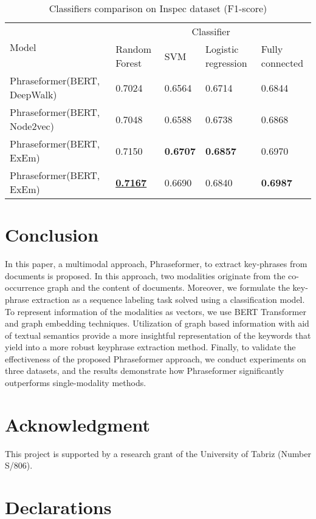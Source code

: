 \documentclass[review,3p]{elsarticle}
\begin{document}
\begin{table}[H]
\centering
	\caption{Classifiers comparison on Inspec dataset (F1-score)}
	\label{classifier_re_tb}
	\begin{tabular}{p{4.4cm}|p{3cm}|p{1.5cm}|p{3cm}|p{3cm}}
\hline
\multirow{2}{*}{Model} & \multicolumn{4}{c}{Classifier}\\
\cline{2-5}
&Random Forest  &  SVM   & Logistic regression & Fully connected \\
\hline
Phraseformer(BERT, DeepWalk)& 0.7024 & 0.6564& 0.6714& 0.6844\\ 
Phraseformer(BERT, Node2vec)& 0.7048& 0.6588 & 0.6738& 0.6868\\ 
Phraseformer(BERT, ExEm)&0.7150& \textbf{0.6707}& \textbf{0.6857}& 0.6970 \\ 
Phraseformer(BERT, ExEm)& \underline{\textbf{0.7167}}& 0.6690& 0.6840& \textbf{0.6987}\\ \hline

\end{tabular}
\end{table}

\section{Conclusion} \label{sec:conclusion}
In this paper, a multimodal approach, Phraseformer, to extract key-phrases from documents is proposed. In this approach, two modalities originate from the co-occurrence graph and the content of documents. Moreover, we formulate the key-phrase  extraction as a sequence  labeling task solved using a classification model. To represent information of the modalities as vectors, we use BERT Transformer and graph embedding techniques. Utilization of graph based information with aid of textual semantics provide a more insightful representation of the keywords that yield into a more robust keyphrase extraction method. Finally, to validate the effectiveness of the proposed Phraseformer approach, we conduct experiments  on  three  datasets,  and  the results demonstrate how Phraseformer significantly outperforms single-modality methods.

\section*{Acknowledgment}
This project is supported by a research grant of the University of Tabriz (Number S/806).

\section*{Declarations}
\end{document}
